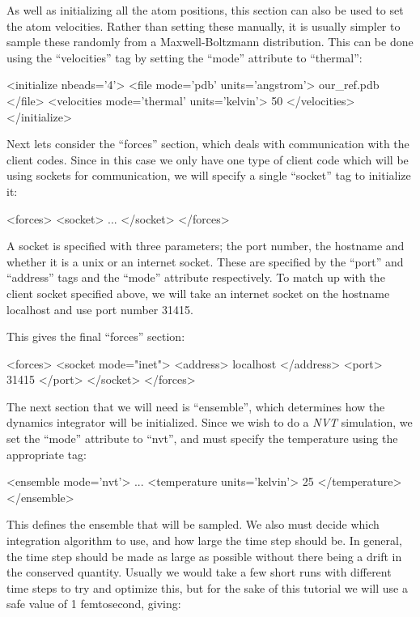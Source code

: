 \documentclass[11pt,english,fleqn]{report}
\newenvironment{code}{%
\footnotesize 
\verbatim
}{
\endverbatim
\normalsize
}
\begin{document}
As well as initializing all the atom positions, this section
can also be used to set the atom velocities. Rather than setting these manually,
it is usually simpler to sample these randomly from a Maxwell-Boltzmann
distribution. This can be done using the
{}``velocities'' tag by setting the {}``mode'' attribute to {}``thermal'':

\begin{code}
<initialize nbeads='4'>
   <file mode='pdb' units='angstrom'> our_ref.pdb </file>
   <velocities mode='thermal' units='kelvin'> 50 </velocities>
</initialize>
\end{code}

Next lets consider the {}``forces'' section, which deals with communication
with the client codes. Since in this case we only have one type of
client code which will be using sockets for communication, we will
specify a single {}``socket'' tag to initialize it:

\begin{code}
<forces>
   <socket>
      ...
   </socket>
</forces>
\end{code}

A socket is specified with three parameters; the port number, the
hostname and whether it is a unix or an internet socket. 
These are specified by the {}``port'' and {}``address'' tags
and the {}``mode'' attribute respectively.
To match up with the client socket specified above,
we will take an internet socket on the hostname localhost and
use port number 31415. 

This gives the final {}``forces'' section:

\begin{code}
<forces>
   <socket mode="inet">
      <address> localhost </address>
      <port> 31415 </port>
   </socket>
</forces>
\end{code}

The next section that we will need is {}``ensemble'', which determines
how the dynamics integrator will be initialized. Since we wish to
do a \emph{NVT} simulation, we set the {}``mode'' attribute to {}``nvt'',
and must specify the temperature using the appropriate tag:

\begin{code}
<ensemble mode='nvt'>
   ...
   <temperature units='kelvin'> 25 </temperature>
</ensemble>
\end{code}

This defines the ensemble that will be sampled. We also must decide
which integration algorithm to use, and how large the time step should
be. In general, the time step should be made as large as possible
without there being a drift in the conserved quantity. Usually we
would take a few short runs with different time steps to try and optimize
this, but for the sake of this tutorial we will use a safe value of
1 femtosecond, giving:
\end{document}
